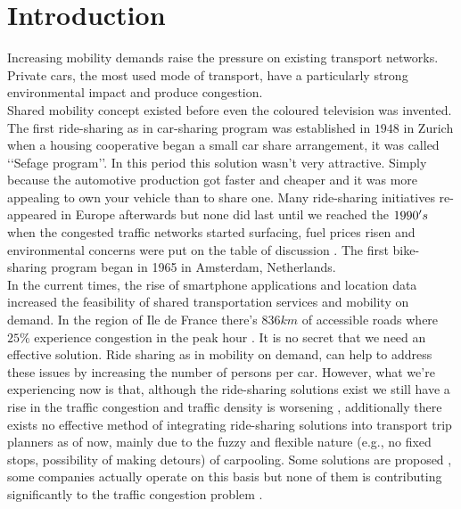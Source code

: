 \documentclass{article}
\begin{document}
\section{Introduction}


Increasing mobility demands raise the pressure on existing transport networks. Private cars, the most used mode of transport, have a particularly strong environmental impact and produce congestion. \\

Shared mobility concept existed before even the coloured television was invented. The first ride-sharing as in car-sharing program was established in $1948$ in Zurich when a housing cooperative began a small car share arrangement, it was called \lq\lq{Sefage program}\rq\rq. In this period this solution wasn\rq{t} very attractive. Simply because the automotive production got faster and cheaper and it was more appealing to own your vehicle than to share one. Many ride-sharing initiatives re-appeared in Europe afterwards but none did last until we reached the $1990\rq{s}$ when the congested traffic networks started surfacing, fuel prices risen and environmental concerns were put on the table of discussion \citep{BECKER2017}. The first bike-sharing program began in 1965 in Amsterdam, Netherlands. \\

In the current times, the rise of smartphone applications and location data increased the feasibility of shared transportation services and mobility on demand. In the region of Ile de France there\rq{s} $836km$ of accessible roads where $25\%$ experience congestion in the peak hour \cite{Traffic_france}. It is no secret that we need an effective solution. Ride sharing as in mobility on demand, can help to address these issues by increasing the number of persons per car. However, what we\rq{re} experiencing now is that, although the ride-sharing solutions exist we still have a rise in the traffic congestion and traffic density is worsening \cite{Forbes_congestion}, additionally there exists no effective method of integrating ride-sharing solutions into transport trip planners as of now, mainly due to the fuzzy and flexible nature (e.g., no fixed stops, possibility of making detours) of carpooling. Some solutions are proposed \cite{STIGLIC201812}\cite{Alonso-Mora462}, some companies actually operate on this basis but none of them is contributing significantly to the traffic congestion problem \cite{schaller_consulting}\cite{schaller_consult}\cite{Forbes_congestion}.\\  
\end{document}
